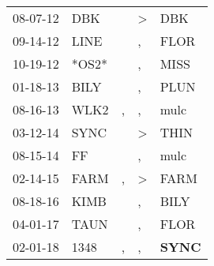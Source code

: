 \begin{supertabular}{p{0.07\textwidth}p{0.06\textwidth}p{0.02\textwidth}p{0.02\textwidth}p{0.06\textwidth}}
 08-07-12\textsuperscript{} &   DBK\textsuperscript{} &    &  \textgreater &            DBK\textsuperscript{} \\
 09-14-12\textsuperscript{} &  LINE\textsuperscript{} &    &             , &           FLOR\textsuperscript{} \\
 10-19-12\textsuperscript{} &                   *OS2* &    &             , &           MISS\textsuperscript{} \\
 01-18-13\textsuperscript{} &  BILY\textsuperscript{} &    &             , &           PLUN\textsuperscript{} \\
 08-16-13\textsuperscript{} &  WLK2\textsuperscript{} &  , &             , &           mulc\textsuperscript{} \\
 03-12-14\textsuperscript{} &  SYNC\textsuperscript{} &    &  \textgreater &           THIN\textsuperscript{} \\
 08-15-14\textsuperscript{} &    FF\textsuperscript{} &    &             , &           mulc\textsuperscript{} \\
 02-14-15\textsuperscript{} &  FARM\textsuperscript{} &  , &  \textgreater &           FARM\textsuperscript{} \\
 08-18-16\textsuperscript{} &  KIMB\textsuperscript{} &    &             , &           BILY\textsuperscript{} \\
 04-01-17\textsuperscript{} &  TAUN\textsuperscript{} &    &             , &           FLOR\textsuperscript{} \\
 02-01-18\textsuperscript{} &  1348\textsuperscript{} &  , &             , &  \textbf{SYNC\textsuperscript{}} \\
\end{supertabular}
